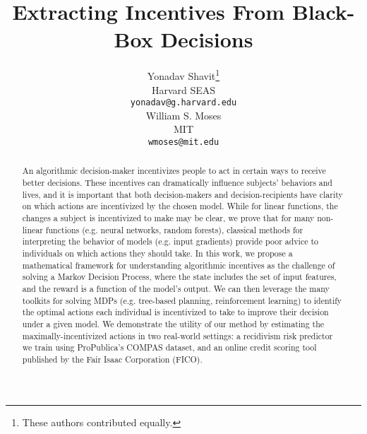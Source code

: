 \documentclass{article}
\title{Extracting Incentives From Black-Box Decisions}
\author{%
  Yonadav Shavit\thanks{These authors contributed equally.} \\
  Harvard SEAS\\
  \texttt{yonadav@g.harvard.edu} \\
   \And
   William S. Moses\footnotemark[1] \\
   MIT \\
   \texttt{wmoses@mit.edu} \\
}
\begin{document}
\maketitle

\begin{abstract}
    An algorithmic decision-maker incentivizes people to act in certain ways to receive better decisions.
    These incentives can dramatically influence subjects' behaviors and lives, and it is important that both decision-makers and decision-recipients have clarity on which actions are incentivized by the chosen model.
    While for linear functions, the changes a subject is incentivized to make may be clear, we prove that for many non-linear functions (e.g. neural networks, random forests), classical methods for interpreting the behavior of models (e.g. input gradients) provide poor advice to individuals on which actions they should take.
    In this work, we propose a mathematical framework for understanding algorithmic incentives as the challenge of solving
    a Markov Decision Process, where the state includes the set of input features, and the reward is a function of the model's output.
    We can then leverage the many toolkits for solving MDPs (e.g. tree-based planning, reinforcement learning) to identify the optimal actions each individual is incentivized to take to improve their decision under a given model.
    We demonstrate the utility of our method by estimating the maximally-incentivized actions in two real-world settings: 
    a recidivism risk predictor we train using ProPublica's COMPAS dataset, and
    an online credit scoring tool published by the Fair Isaac Corporation (FICO).
\end{abstract}








\vspace{1cm}
\newpage


\vspace{1cm}
\newpage
\appendix

\end{document}
